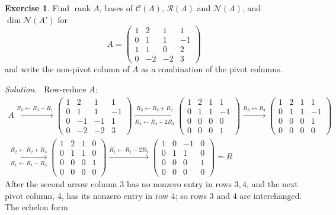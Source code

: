 \documentclass[12pt]{article}
\DeclareMathOperator{\rank}{rank}
\theoremstyle{definition}
\newtheorem{exercise}{Exercise}
\newenvironment{solution}{\par\noindent\textit{Solution.}\ }{\par\smallskip}
\begin{document}
\begin{exercise}\label{ex:r4-rank-drill}
Find \(\rank A\), bases of \(\mathcal C(A)\), \(\mathcal R(A)\) and \(\mathcal N(A)\), and
\(\dim\mathcal N(A')\) for
\[
A=\begin{pmatrix}1&2&1&1\\0&1&1&-1\\1&1&0&2\\0&-2&-2&3\end{pmatrix}
\]
and write the non-pivot column of \(A\) as a combination of the pivot columns.
\end{exercise}
\begin{solution}
Row-reduce \(A\):
\[
\begin{gathered}
A\xrightarrow{R_3\leftarrow R_3-R_1}
\begin{pmatrix}1&2&1&1\\0&1&1&-1\\0&-1&-1&1\\0&-2&-2&3\end{pmatrix}
\xrightarrow[R_4\leftarrow R_4+2R_2]{R_3\leftarrow R_3+R_2}
\begin{pmatrix}1&2&1&1\\0&1&1&-1\\0&0&0&0\\0&0&0&1\end{pmatrix}
\xrightarrow{R_3\leftrightarrow R_4}
\begin{pmatrix}1&2&1&1\\0&1&1&-1\\0&0&0&1\\0&0&0&0\end{pmatrix}
\\
\xrightarrow[R_1\leftarrow R_1-R_3]{R_2\leftarrow R_2+R_3}
\begin{pmatrix}1&2&1&0\\0&1&1&0\\0&0&0&1\\0&0&0&0\end{pmatrix}
\xrightarrow{R_1\leftarrow R_1-2R_2}
\begin{pmatrix}1&0&-1&0\\0&1&1&0\\0&0&0&1\\0&0&0&0\end{pmatrix}=R
\end{gathered}
\]
After the second arrow column \(3\) has no nonzero entry in rows \(3,4\), and the next pivot column,
\(4\), has its nonzero entry in row \(4\); so rows \(3\) and \(4\) are interchanged. The echelon form

\end{solution}
\end{document}
